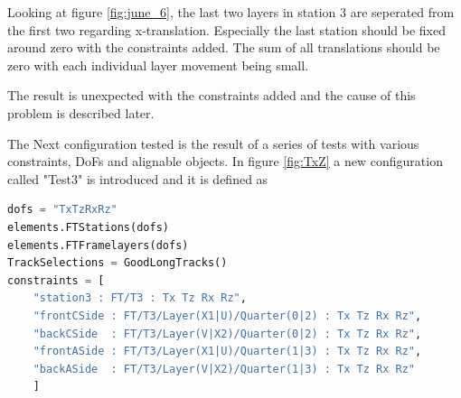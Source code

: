 Looking at figure \ref{fig:june_6}, the last two layers in station 3 are
seperated from the first two regarding x-translation. Especially the last
station should be fixed around zero with the constraints added. The sum of
all translations should be zero with each individual layer movement being small.

The result is unexpected with the constraints added and the cause of this
problem is described later.

The Next configuration tested is the result of a series of tests with various constraints, DoFs and alignable objects. In figure \ref{fig:TxZ} a new configuration called "Test3" is introduced and it is defined as

\begin{lstlisting}[language=Python]
dofs = "TxTzRxRz"
elements.FTStations(dofs)
elements.FTFramelayers(dofs)
TrackSelections = GoodLongTracks()
constraints = [
    "station3 : FT/T3 : Tx Tz Rx Rz",
    "frontCSide : FT/T3/Layer(X1|U)/Quarter(0|2) : Tx Tz Rx Rz",
    "backCSide  : FT/T3/Layer(V|X2)/Quarter(0|2) : Tx Tz Rx Rz",
    "frontASide : FT/T3/Layer(X1|U)/Quarter(1|3) : Tx Tz Rx Rz",
    "backASide  : FT/T3/Layer(V|X2)/Quarter(1|3) : Tx Tz Rx Rz"
    ]
\end{lstlisting}

